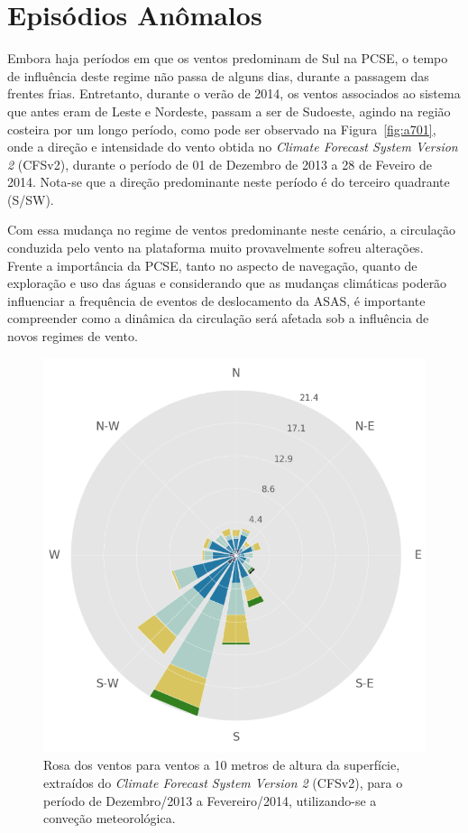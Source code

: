 \section{Episódios Anômalos}
\label{sec:anomamlousEpisodes}

\hspace{5mm} Embora haja períodos em que os ventos predominam de Sul na PCSE, o tempo de
influência deste regime não passa de alguns dias, durante a passagem das frentes frias.
Entretanto, durante o verão de 2014, os ventos associados ao sistema que antes eram de Leste e
Nordeste, passam a ser de Sudoeste, agindo na região costeira por um longo período, como
pode ser observado na Figura~\ref{fig:a701}, onde a direção e intensidade do vento
obtida no \textit{Climate Forecast System Version 2} (CFSv2), durante o período de
01 de Dezembro de 2013 a 28 de Feveiro de 2014. Nota-se que a direção
predominante neste período é do terceiro quadrante (S/SW).

\hspace{5mm} Com essa mudança no regime de ventos predominante neste
cenário, a circulação conduzida pelo vento na plataforma muito provavelmente sofreu alterações.
Frente a importância da PCSE, tanto no aspecto de navegação, quanto de
exploração e uso das águas e considerando que as mudanças climáticas poderão
influenciar a frequência de eventos de deslocamento da ASAS, é importante compreender
como a dinâmica da circulação será afetada sob a influência de novos regimes
de vento.

\begin{figure}[!h]
    \centering
    \includegraphics[width=0.65\linewidth]{figuras/windrose_2014CFSv2.png}
\caption[Rosa dos Ventos para Dezembro/2013 a Fevereiro/2014]{Rosa dos ventos para ventos a 10 metros de altura da superfície, extraídos do \textit{Climate Forecast System Version 2} (CFSv2), para o período de Dezembro/2013 a Fevereiro/2014, utilizando-se a conveção meteorológica.}
    \label{fig:pcnsp}
\end{figure}

